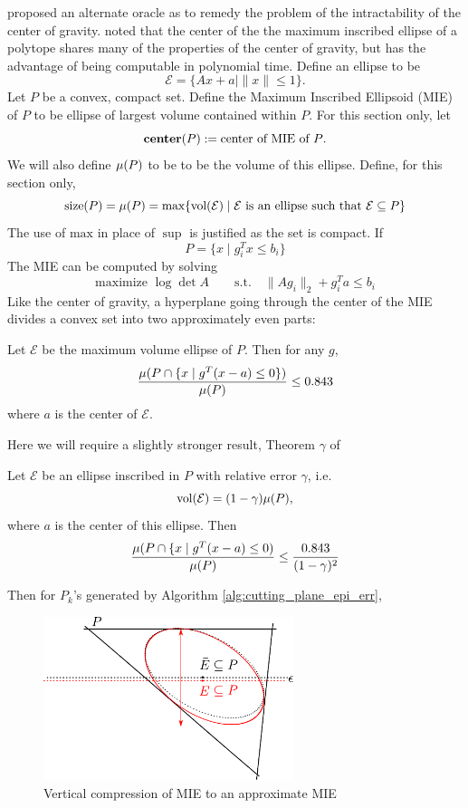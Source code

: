 \cite{tarasov1988method} proposed an alternate oracle as to remedy the problem
of the intractability of the center of gravity. \cite{tarasov1988method} noted
that the center of the  the maximum inscribed ellipse of a polytope shares
many of the properties of the center of gravity, but has the advantage of
being computable in polynomial time. Define an ellipse to be
$$
\mathcal{E} = \{ Ax + a\mid \|x\|\leq 1\}.
$$
Let $P$ be a convex, compact set.  Define the Maximum Inscribed Ellipsoid
(MIE) of $P$ to be ellipse of largest volume contained within $P$. For this
section only, let
$$
\mbox{\bf center}(P) := \mbox{center of MIE of $P$}.
$$
We will
also define $\mu(P)$ to be to be the volume of this ellipse. Define, for this section only,
$$
\mbox{size}(P) = \mu(P) = \mbox{max} \{ \textnormal{vol}(\mathcal{E}) \mid \mathcal{E} \mbox{ is an ellipse such that } \mathcal{E}\subseteq P \}
$$
The use of $\mbox{max}$ in place of $\sup$ is justified as the set is compact.
If 
$$P = \{ x \mid g_i^Tx \leq b_i \}$$
The MIE can be computed by solving
$$
\mbox{maximize } \log\det A \qquad \mbox{s.t.}\quad  \|Ag_i\|_2+g_i^Ta \leq b_i
$$
Like the center of gravity, a hyperplane going through the center of the MIE
divides a convex set into two approximately even parts:
\begin{thm} \label{thm:MIE_cut} \cite{tarasov1988method} 
Let $\mathcal{E}$ be the maximum volume ellipse of $P$. Then for any $g$,
$$
\frac{\mu(P \cap \{ x \mid g^T(x - a)\leq 0\}) }{\mu(P)} \leq 0.843  
$$
where $a$ is the center of $\mathcal{E}$.
\end{thm}

\noindent
Here we will require a slightly stronger result, Theorem $\gamma$ of
\cite{tarasov1988method}

\begin{lem} \label{lem:approx-MIE-vol} 
Let $\mathcal{E}$ be an ellipse inscribed in $P$ with relative error
$\gamma$, i.e.
$$
\textnormal{vol}(\mathcal{E})=(1-\gamma)\mu(P),
$$
where $a$ is the center of this ellipse. Then
\[ 
\frac{\mu(P\cap\{x\mid g^{T}(x-a)\leq0)}{\mu(P)}\leq\frac{0.843}{(1-\gamma)^2}
\]
\end{lem}
\noindent Then for $P_k$'s generated by Algorithm \ref{alg:cutting_plane_epi_err},

\begin{figure}
\begin{centering}
\includegraphics[width=0.65\textwidth]{cutting/fig2}
\par\end{centering}
\caption{Vertical compression of MIE to an approximate MIE}
\end{figure}

